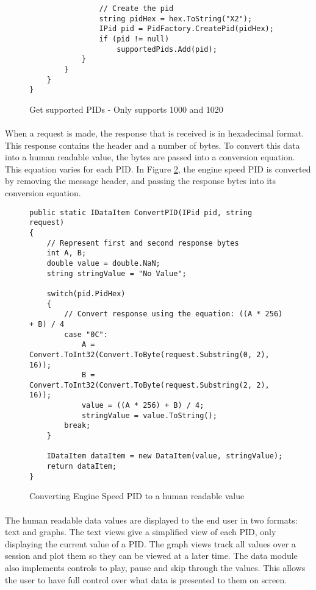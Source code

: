 {\begin{figure}[h]
\begin{lstlisting}
				// Create the pid
				string pidHex = hex.ToString("X2");
				IPid pid = PidFactory.CreatePid(pidHex);
				if (pid != null)
					supportedPids.Add(pid);
			}
		}
	}
}
			\end{lstlisting}
			\caption{Get supported PIDs - Only supports 1000 and 1020}
			\label{code:SupportedPids}
		\end{figure}
		
		\paragraph{}{
		When a request is made, the response that is received is in hexadecimal format. This response contains the header and a number of bytes. To convert this data into a human readable value, the bytes are passed into a conversion equation. This equation varies for each PID. In Figure \ref{code:ConvertingPids}, the engine speed PID is converted by removing the message header, and passing the response bytes into its conversion equation.
		}
		
		\begin{figure}[h]
			\begin{lstlisting}
public static IDataItem ConvertPID(IPid pid, string request)
{
	// Represent first and second response bytes
	int A, B;
	double value = double.NaN;
	string stringValue = "No Value";
	
	switch(pid.PidHex)
	{
		// Convert response using the equation: ((A * 256) + B) / 4
		case "0C":    
			A = Convert.ToInt32(Convert.ToByte(request.Substring(0, 2), 16));
			B = Convert.ToInt32(Convert.ToByte(request.Substring(2, 2), 16));
			value = ((A * 256) + B) / 4;
			stringValue = value.ToString();
		break;
	}

	IDataItem dataItem = new DataItem(value, stringValue);	
    return dataItem;
}
			\end{lstlisting}
			\caption{Converting Engine Speed PID to a human readable value}
			\label{code:ConvertingPids}
		\end{figure}		
			
		\paragraph{}{
		The human readable data values are displayed to the end user in two formats: text and graphs. The text views give a simplified view of each PID, only displaying the current value of a PID. The graph views track all values over a session and plot them so they can be viewed at a later time. The data module also implements controls to play, pause and skip through the values. This allows the user to have full control over what data is presented to them on screen. 
		}
		
}
